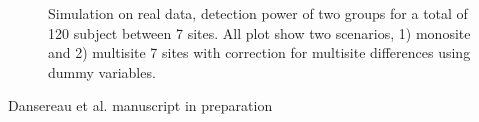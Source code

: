\documentclass[authoryear]{elsarticle}
\begin{document}
\begin{figure}[H!]
\centering
\captionsetup[subfloat]{labelformat=empty}
\hspace{1mm}
\hspace{1mm}
\hspace{1mm}
\tiny Simulation on real data, detection power of two groups for a total of 120 subject between 7 sites. All plot show two scenarios, 1) monosite and 2) multisite 7 sites with correction for multisite differences using dummy variables.
\end{figure}
\tiny Dansereau et al. manuscript in preparation
\end{document}
